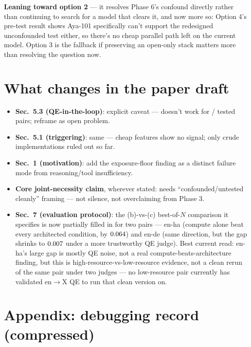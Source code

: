\documentclass[11pt]{article}
\begin{document}
\noindent\textbf{Leaning toward option 2} --- it resolves Phase 6's confound directly rather
than continuing to search for a model that clears it, and now more so: Option 4's pre-test
result shows Aya-101 specifically can't support the redesigned unconfounded test either, so
there's no cheap parallel path left on the current model. Option 3 is the fallback if
preserving an open-only stack matters more than resolving the question now.

\section*{What changes in the paper draft}

\begin{itemize}
  \item \textbf{Sec.~5.3 (QE-in-the-loop)}: explicit caveat --- doesn't work for
    \PhaseOneNPairsFlagged/\PhaseOneNPairsTotal{} tested pairs; reframe as open problem.
  \item \textbf{Sec.~5.1 (triggering)}: same --- cheap features show no signal; only crude
    implementations ruled out so far.
  \item \textbf{Sec.~1 (motivation)}: add the exposure-floor finding as a distinct failure mode
    from reasoning/tool insufficiency.
  \item \textbf{Core joint-necessity claim}, wherever stated: needs
    ``confounded/untested cleanly'' framing --- not silence, not overclaiming from Phase 3.
  \item \textbf{Sec.~7 (evaluation protocol)}: the (b)-vs-(c) best-of-$N$ comparison it
    specifies is now partially filled in for two pairs --- en-ha (compute alone beat every
    architected condition, by $0.064$) and en-de (same direction,
    but the gap shrinks to $0.007$ under a more trustworthy QE
    judge). Best current read: en-ha's large gap is mostly QE noise, not a real
    compute-beats-architecture finding, but this is high-resource-vs-low-resource evidence,
    not a clean rerun of the same pair under two judges --- no low-resource pair currently has
    validated en$\to$X QE to run that clean version on.
\end{itemize}

\appendix
\section*{Appendix: debugging record (compressed)}
\end{document}
